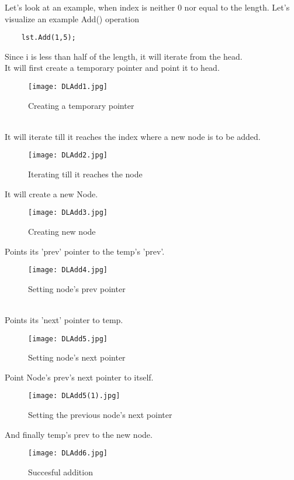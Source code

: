 \documentclass[11pt,fleqn]{book} %
\begin{document}
\begin{example}
  Let's look at an example, when index is neither 0 nor equal to the length.
  Let's visualize an example Add() operation\\
  \begin{lstlisting}
    lst.Add(1,5);
  \end{lstlisting}
  Since i is less than half of the length, it will iterate from the head.\\
  It will first create a temporary pointer and point it to head.
  \begin{figure}[H]
    \centering
    \texttt{[image: DLAdd1.jpg]}
    \caption{Creating a temporary pointer}
  \end{figure} ~\\
  It will iterate till it reaches the index where a new node is to be added.
  \begin{figure}[H]
    \centering
    \texttt{[image: DLAdd2.jpg]}
    \caption{Iterating till it reaches the node}
  \end{figure}
  It will create a new Node.
  \begin{figure}[H]
    \centering
    \texttt{[image: DLAdd3.jpg]}
    \caption{Creating new node}
  \end{figure}
  Points its 'prev' pointer to the temp's 'prev'.
  \begin{figure}[H]
    \centering
    \texttt{[image: DLAdd4.jpg]}
    \caption{Setting node's prev pointer}
  \end{figure}~\\
  Points its 'next' pointer to temp.
  \begin{figure}[H]
    \centering
    \texttt{[image: DLAdd5.jpg]}
    \caption{Setting node's next pointer}
  \end{figure}
  Point Node's prev's next pointer to itself.
  \begin{figure}[H]
    \centering
    \texttt{[image: DLAdd5(1).jpg]}
    \caption{Setting the previous node's next pointer}
  \end{figure}
  And finally temp's prev to the new node.
  \begin{figure}[H]
    \centering
    \texttt{[image: DLAdd6.jpg]}
    \caption{Succesful addition}
  \end{figure}
\end{example}
\end{document}
